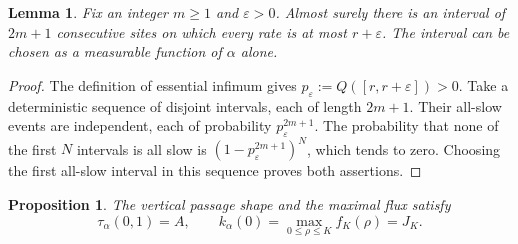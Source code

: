 \documentclass[11pt]{amsart}
\newtheorem{proposition}[theorem]{Proposition}
\newtheorem{lemma}[theorem]{Lemma}
\theoremstyle{remark}
\numberwithin{equation}{section}
\begin{document}
\begin{lemma}\label{lem:slow-intervals}
Fix an integer $m\geq1$ and $\varepsilon>0$. Almost surely there is an interval
of $2m+1$ consecutive sites on which every rate is at most
$r+\varepsilon$. The interval can be chosen as a measurable function
of $\alpha$ alone.
\end{lemma}

\begin{proof}
The definition of essential infimum gives
$p_\varepsilon:=Q([r,r+\varepsilon])>0$.
Take a deterministic sequence of disjoint intervals, each of length
$2m+1$. Their all-slow events are independent, each of probability
$p_\varepsilon^{2m+1}$. The probability that none of the first $N$
intervals is all slow is
$(1-p_\varepsilon^{2m+1})^N$, which tends to zero. Choosing the first
all-slow interval in this sequence proves both assertions.
\end{proof}

\begin{proposition}\label{prop:capacity}
The vertical passage shape and the maximal flux satisfy
\begin{equation}\label{eq:capacity}
 \tau_\alpha(0,1)=A,\qquad
 k_\alpha(0)=\max_{0\leq\rho\leq K}f_K(\rho)=J_K.
\end{equation}
\end{proposition}
\end{document}

